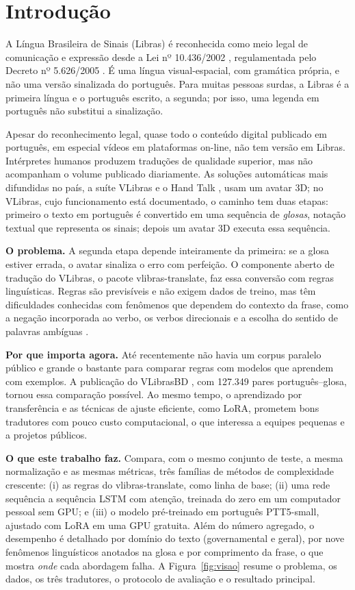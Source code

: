 \documentclass[12pt]{article}
\newcommand{\gl}[1]{\textsf{\small #1}}
\begin{document}
\section{Introdução}

A Língua Brasileira de Sinais (Libras) é reconhecida como meio legal de comunicação e expressão desde a Lei nº 10.436/2002 \cite{lei}, regulamentada pelo Decreto nº 5.626/2005 \cite{decreto}. É uma língua visual-espacial, com gramática própria, e não uma versão sinalizada do português. Para muitas pessoas surdas, a Libras é a primeira língua e o português escrito, a segunda; por isso, uma legenda em português não substitui a sinalização.

Apesar do reconhecimento legal, quase todo o conteúdo digital publicado em português, em especial vídeos em plataformas on-line, não tem versão em Libras. Intérpretes humanos produzem traduções de qualidade superior, mas não acompanham o volume publicado diariamente. As soluções automáticas mais difundidas no país, a suíte VLibras \cite{lima2022} e o Hand Talk \cite{handtalk}, usam um avatar 3D; no VLibras, cujo funcionamento está documentado, o caminho tem duas etapas: primeiro o texto em português é convertido em uma sequência de \emph{glosas}, notação textual que representa os sinais; depois um avatar 3D executa essa sequência.

\textbf{O problema.} A segunda etapa depende inteiramente da primeira: se a glosa estiver errada, o avatar sinaliza o erro com perfeição. O componente aberto de tradução do VLibras, o pacote \gl{vlibras-translate}, faz essa conversão com regras linguísticas. Regras são previsíveis e não exigem dados de treino, mas têm dificuldades conhecidas com fenômenos que dependem do contexto da frase, como a negação incorporada ao verbo, os verbos direcionais e a escolha do sentido de palavras ambíguas \cite{lima2022}.

\textbf{Por que importa agora.} Até recentemente não havia um corpus paralelo público e grande o bastante para comparar regras com modelos que aprendem com exemplos. A publicação do VLibrasBD \cite{lima2025}, com 127.349 pares português--glosa, tornou essa comparação possível. Ao mesmo tempo, o aprendizado por transferência e as técnicas de ajuste eficiente, como LoRA, prometem bons tradutores com pouco custo computacional, o que interessa a equipes pequenas e a projetos públicos.

\textbf{O que este trabalho faz.} Compara, com o mesmo conjunto de teste, a mesma normalização e as mesmas métricas, três famílias de métodos de complexidade crescente: (i) as regras do \gl{vlibras-translate}, como linha de base; (ii) uma rede sequência a sequência LSTM com atenção, treinada do zero em um computador pessoal sem GPU; e (iii) o modelo pré-treinado em português PTT5-small, ajustado com LoRA em uma GPU gratuita. Além do número agregado, o desempenho é detalhado por domínio do texto (governamental e geral), por nove fenômenos linguísticos anotados na glosa e por comprimento da frase, o que mostra \emph{onde} cada abordagem falha. A Figura~\ref{fig:visao} resume o problema, os dados, os três tradutores, o protocolo de avaliação e o resultado principal.
\end{document}
